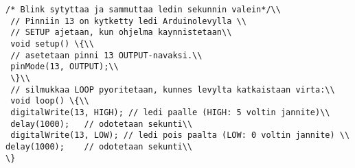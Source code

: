 \begin{lstlisting}[language=Arduino]  
 /* Blink sytyttaa ja sammuttaa ledin sekunnin valein*/\\
 // Pinniin 13 on kytketty ledi Arduinolevylla \\
 // SETUP ajetaan, kun ohjelma kaynnistetaan\\
 void setup() \{\\
 // asetetaan pinni 13 OUTPUT-navaksi.\\
 pinMode(13, OUTPUT);\\
 \}\\
 // silmukkaa LOOP pyoritetaan, kunnes levylta katkaistaan virta:\\
 void loop() \{\\
 digitalWrite(13, HIGH); // ledi paalle (HIGH: 5 voltin jannite)\\
 delay(1000);	// odotetaan sekunti\\
 digitalWrite(13, LOW); // ledi pois paalta (LOW: 0 voltin jannite) \\
delay(1000);	// odotetaan sekunti\\   
\}
\end{lstlisting}
